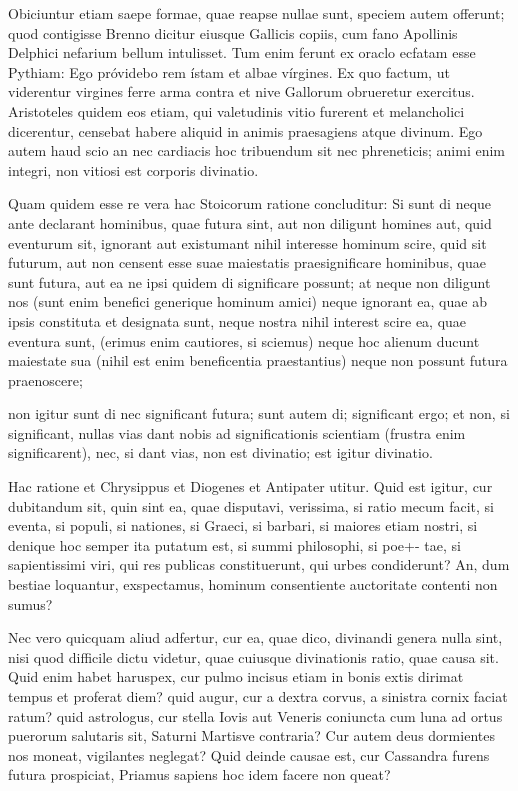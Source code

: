  Obiciuntur etiam saepe formae, quae reapse nullae sunt, speciem autem offerunt; quod contigisse Brenno dicitur eiusque Gallicis copiis, cum fano Apollinis Delphici nefarium bellum intulisset. Tum enim ferunt ex oraclo ecfatam esse Pythiam: Ego próvidebo rem ístam et albae vírgines. Ex quo factum, ut viderentur virgines ferre arma contra et nive Gallorum obrueretur exercitus. Aristoteles quidem eos etiam, qui valetudinis vitio furerent et melancholici dicerentur, censebat habere aliquid in animis praesagiens atque divinum. Ego autem haud scio an nec cardiacis hoc tribuendum sit nec phreneticis; animi enim integri, non vitiosi est corporis divinatio.

 Quam quidem esse re vera hac Stoicorum ratione concluditur: Si sunt di neque ante declarant hominibus, quae futura sint, aut non diligunt homines aut, quid eventurum sit, ignorant aut existumant nihil interesse hominum scire, quid sit futurum, aut non censent esse suae maiestatis praesignificare hominibus, quae sunt futura, aut ea ne ipsi quidem di significare possunt; at neque non diligunt nos (sunt enim benefici generique hominum amici) neque ignorant ea, quae ab ipsis constituta et designata sunt, neque nostra nihil interest scire ea, quae eventura sunt, (erimus enim cautiores, si sciemus) neque hoc alienum ducunt maiestate sua (nihil est enim beneficentia praestantius) neque non possunt futura praenoscere;

 non igitur sunt di nec significant futura; sunt autem di; significant ergo; et non, si significant, nullas vias dant nobis ad significationis scientiam (frustra enim significarent), nec, si dant vias, non est divinatio; est igitur divinatio.

 Hac ratione et Chrysippus et Diogenes et Antipater utitur. Quid est igitur, cur dubitandum sit, quin sint ea, quae disputavi, verissima, si ratio mecum facit, si eventa, si populi, si nationes, si Graeci, si barbari, si maiores etiam nostri, si denique hoc semper ita putatum est, si summi philosophi, si poe+- tae, si sapientissimi viri, qui res publicas constituerunt, qui urbes condiderunt? An, dum bestiae loquantur, exspectamus, hominum consentiente auctoritate contenti non sumus?

 Nec vero quicquam aliud adfertur, cur ea, quae dico, divinandi genera nulla sint, nisi quod difficile dictu videtur, quae cuiusque divinationis ratio, quae causa sit. Quid enim habet haruspex, cur pulmo incisus etiam in bonis extis dirimat tempus et proferat diem? quid augur, cur a dextra corvus, a sinistra cornix faciat ratum? quid astrologus, cur stella Iovis aut Veneris coniuncta cum luna ad ortus puerorum salutaris sit, Saturni Martisve contraria? Cur autem deus dormientes nos moneat, vigilantes neglegat? Quid deinde causae est, cur Cassandra furens futura prospiciat, Priamus sapiens hoc idem facere non queat?

